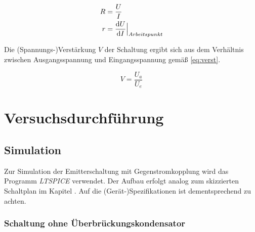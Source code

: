 \documentclass[12pt,english,ngerman]{scrartcl}
\begin{document}
\begin{align}
	R&=\frac{U}{I} \label{eq:ohm}\\
	r&= \frac{\mathrm{d}U}{\mathrm{d}I} \Bigr|_{\substack{Arbeitspunkt}}
\end{align}

Die (Spannungs-)Verstärkung $V$ der Schaltung ergibt sich aus dem Verhältnis
zwischen Ausgangsspannung und Eingangsspannung gemäß \autoref{eq:verst}.

\begin{equation}
	V=\frac{U_a}{U_e}
	\label{eq:verst}
\end{equation}

\section{Versuchsdurchführung}\label{sec:Versuchsdurchf}

\subsection{Simulation} \label{sec:Versuchsim}

Zur Simulation der Emitterschaltung mit Gegenstromkopplung wird das Programm
\textit{LTSPICE} verwendet. Der Aufbau erfolgt analog zum skizzierten Schaltplan im
Kapitel . Auf die (Gerät-)Spezifikationen ist dementsprechend zu achten.

\subsubsection{Schaltung ohne Überbrückungskondensator} \label{sec:Versuchohnekond}
\end{document}

